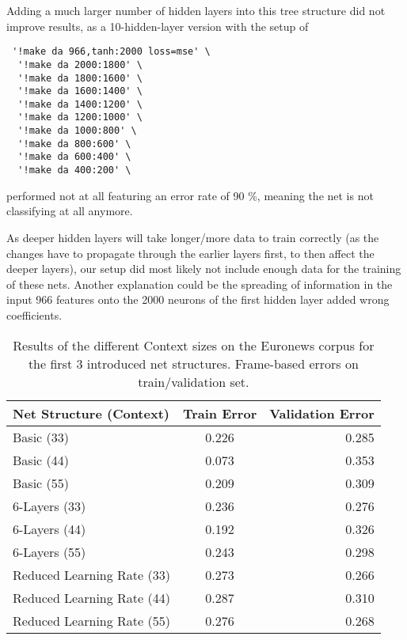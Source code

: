 Adding a much larger number of hidden layers into this tree structure did not improve results, as a 10-hidden-layer version with the setup of

\begin{verbatim}
 '!make da 966,tanh:2000 loss=mse' \
  '!make da 2000:1800' \
  '!make da 1800:1600' \
  '!make da 1600:1400' \
  '!make da 1400:1200' \
  '!make da 1200:1000' \
  '!make da 1000:800' \
  '!make da 800:600' \
  '!make da 600:400' \
  '!make da 400:200' \
\end{verbatim}

performed not at all featuring an error rate of 90 \%, meaning the net is not classifying at all anymore. 

As deeper hidden layers will take longer/more data to train correctly (as the changes have to propagate through the earlier layers first, to then affect the deeper layers), our setup did most likely not include enough data for the training of these nets. Another explanation could be the spreading of information in the input 966 features onto the 2000 neurons of the first hidden layer added wrong coefficients.

\begin{table}[h!]
\caption{Results of the different Context sizes on the Euronews corpus for the first 3 introduced net structures. Frame-based errors on train/validation set.}
\centering
\begin{tabular}{| l | c | r | }
	\hline
	\textbf{Net Structure (Context)} & \textbf{Train Error} & \textbf{Validation Error}  \\
	\hline
	Basic (33) & 0.226 &  0.285 \\
	\hline
	Basic (44) & 0.073 & 0.353 \\
	\hline
	Basic (55) & 0.209 & 0.309 \\
	\hline
	6-Layers (33) & 0.236 & 0.276 \\
	\hline
	6-Layers (44) & 0.192 & 0.326 \\
	\hline
	6-Layers (55) & 0.243 & 0.298 \\
	\hline
	Reduced Learning Rate (33) & 0.273 & 0.266 \\ 
	\hline
	Reduced Learning Rate (44) & 0.287 & 0.310 \\ 
	\hline
	Reduced Learning Rate (55) & 0.276 & 0.268 \\ 
	\hline
\end{tabular}
\label{tab:resCtx}
\end{table}


